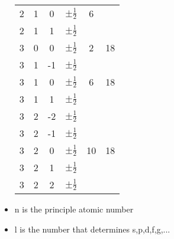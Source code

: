 \documentclass{article}
\begin{document}
\begin{itemize}
\begin{tabular}{c|c|c|c|c|c}
  2 & 1 & 0 & $\pm\frac{1}{2}$ & 6  &   \\
  2 & 1 & 1 & $\pm\frac{1}{2}$&   &   \\
  \hline
  3 & 0 & 0 & $\pm\frac{1}{2}$ & 2  & 18  \\
  \hline
  3 & 1 & -1 & $\pm\frac{1}{2}$ &   &   \\
  3 & 1 & 0 & $\pm\frac{1}{2}$ & 6  & 18  \\
  3 & 1 & 1 & $\pm\frac{1}{2}$ &   &   \\
  \hline
  3 & 2 & -2 & $\pm\frac{1}{2}$ &   &   \\
  3 & 2 & -1 & $\pm\frac{1}{2}$ &   &   \\
  3 & 2 & 0 & $\pm\frac{1}{2}$ & 10  & 18  \\
  3 & 2 & 1 & $\pm\frac{1}{2}$ &   &   \\
  3 & 2 & 2 & $\pm\frac{1}{2}$ &   &   \\    
\end{tabular}
\item n is the principle atomic number
\item l is the number that determines s,p,d,f,g,...
\end{itemize}
\end{document}

